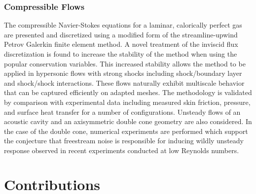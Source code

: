 \subsubsection{Compressible Flows}
The compressible Navier-Stokes equations for a laminar, calorically perfect gas are presented and discretized using a modified form of the streamline-upwind Petrov Galerkin finite element method.  A novel treatment of the inviscid flux discretization is found to increase the stability of the method when using the popular conservation variables.  This increased stability allows the method to be applied in hypersonic flows with strong shocks including shock/boundary layer and shock/shock interactions.  These flows naturally exhibit multiscale behavior that can be captured efficiently on adapted meshes. The methodology is validated by comparison with experimental data including measured skin friction, pressure, and surface heat transfer for a number of configurations.  Unsteady flows of an acoustic cavity and an axisymmetric double cone geometry are also considered.  In the case of the double cone, numerical experiments are performed which support the conjecture that freestream noise is responsible for inducing wildly unsteady response observed in recent experiments conducted at low Reynolds numbers.

\section{Contributions}
